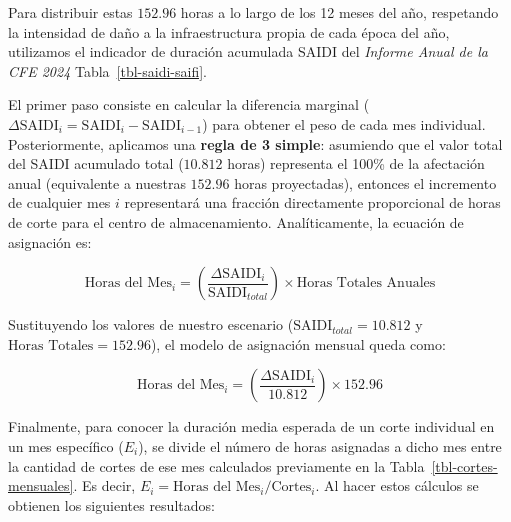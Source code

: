 \documentclass[
  spanish,
  us-letterpaper,
]{scrreprt}
\numberwithin{equation}{section}
\theoremstyle{plain}
\theoremstyle{plain}
\theoremstyle{plain}
\theoremstyle{definition}
\theoremstyle{remark}
\begin{document}
Para distribuir estas \(152.96\) horas a lo largo de los 12 meses del
año, respetando la intensidad de daño a la infraestructura propia de
cada época del año, utilizamos el indicador de duración acumulada SAIDI
del \emph{Informe Anual de la CFE 2024} Tabla~\ref{tbl-saidi-saifi}.

El primer paso consiste en calcular la diferencia marginal
(\(\Delta \text{SAIDI}_i = \text{SAIDI}_i - \text{SAIDI}_{i-1}\)) para
obtener el peso de cada mes individual. Posteriormente, aplicamos una
\textbf{regla de 3 simple}: asumiendo que el valor total del SAIDI
acumulado total (\(10.812\) horas) representa el 100\% de la afectación
anual (equivalente a nuestras \(152.96\) horas proyectadas), entonces el
incremento de cualquier mes \(i\) representará una fracción directamente
proporcional de horas de corte para el centro de almacenamiento.
Analíticamente, la ecuación de asignación es:

\[
\text{Horas del Mes}_i = \left( \frac{\Delta \text{SAIDI}_i}{\text{SAIDI}_{total}} \right) \times \text{Horas Totales Anuales}
\]

Sustituyendo los valores de nuestro escenario
(\(\text{SAIDI}_{total} = 10.812\) y \(\text{Horas Totales} = 152.96\)),
el modelo de asignación mensual queda como:

\[
\text{Horas del Mes}_i = \left( \frac{\Delta \text{SAIDI}_i}{10.812} \right) \times 152.96
\]

Finalmente, para conocer la duración media esperada de un corte
individual en un mes específico (\(E_i\)), se divide el número de horas
asignadas a dicho mes entre la cantidad de cortes de ese mes calculados
previamente en la Tabla~\ref{tbl-cortes-mensuales}. Es decir,
\(E_i = \text{Horas del Mes}_i / \text{Cortes}_i\). Al hacer estos
cálculos se obtienen los siguientes resultados:
\end{document}

